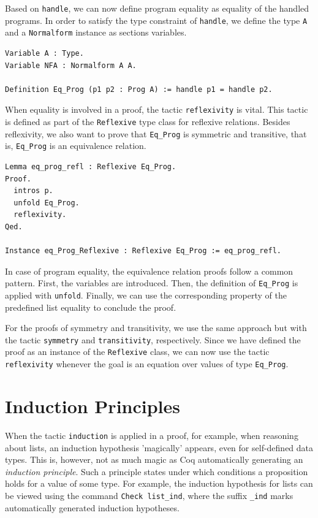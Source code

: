 \documentclass[a4paper, 11pt, fleqn, twoside, abstract=on]{scrreprt}
\newcommand{\cinl}[1]{\texttt{#1}}
\begin{document}
Based on \cinl{handle}, we can now define program equality as equality of the handled programs.
In order to satisfy the type constraint of \cinl{handle}, we define the type \cinl{A} and a \cinl{Normalform} instance as sections variables.

\begin{verbatim}
Variable A : Type.
Variable NFA : Normalform A A.

Definition Eq_Prog (p1 p2 : Prog A) := handle p1 = handle p2.
\end{verbatim}

When equality is involved in a proof, the tactic \cinl{reflexivity} is vital.
This tactic is defined as part of the \cinl{Reflexive} type class for reflexive relations.
Besides reflexivity, we also want to prove that \cinl{Eq_Prog} is symmetric and transitive, that is, \cinl{Eq_Prog} is an equivalence relation.

\begin{verbatim}
Lemma eq_prog_refl : Reflexive Eq_Prog.
Proof. 
  intros p.
  unfold Eq_Prog.
  reflexivity.
Qed.

Instance eq_Prog_Reflexive : Reflexive Eq_Prog := eq_prog_refl.
\end{verbatim}

In case of program equality, the equivalence relation proofs follow a common pattern.
First, the variables are introduced.
Then, the definition of \cinl{Eq_Prog} is applied with \cinl{unfold}.
Finally, we can use the corresponding property of the predefined list equality to conclude the proof.

For the proofs of symmetry and transitivity, we use the same approach but with the tactic \cinl{symmetry} and \cinl{transitivity}, respectively.
Since we have defined the proof as an instance of the \cinl{Reflexive} class, we can now use the tactic \cinl{reflexivity} whenever the goal is an equation over values of type \cinl{Eq_Prog}.

\section{Induction Principles}

When the tactic \cinl{induction} is applied in a proof, for example, when reasoning about lists, an induction hypothesis 'magically' appears, even for self-defined data types.
This is, however, not as much magic as Coq automatically generating an \textit{induction principle}.
Such a principle states under which conditions a proposition holds for a value of some type.
For example, the induction hypothesis for lists can be viewed using the command \cinl{Check list_ind}, where the suffix \cinl{_ind} marks automatically generated induction hypotheses.
\end{document}
